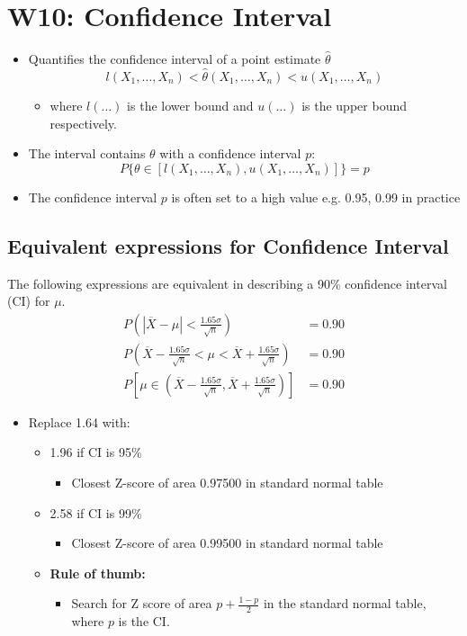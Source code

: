 \documentclass[a4paper]{article}
\begin{document}
\section{W10: Confidence Interval}
\begin{itemize}
    \item Quantifies the confidence interval of a point estimate $\hat{\theta}$
    $$l(X_{1}, \ldots, X_{n})< \hat{\theta}(X_{1}, \ldots, X_{n})<u(X_{1}, \ldots, X_{n})$$
    \begin{itemize}[label=$\circ$]
        \item where $l(\ldots)$ is the lower bound and $u(\ldots)$ is the upper bound respectively. 
    \end{itemize}
    \item The interval contains $\theta$ with a confidence interval $p$:
    $$P\{\theta\in \left[l(X_{1},\ldots, X_{n}), u(X_{1}, \ldots, X_{n})\right] \} = p
    $$
    \item The confidence interval $p$ is often set to a high value e.g. 0.95, 0.99 in practice
\end{itemize}
\subsection{Equivalent expressions for Confidence Interval}
The following expressions are equivalent in describing a 90\% confidence interval (CI) for $\mu$.
\begin{align*}
    P\left(|\overline{X}-\mu| < \frac{1.65\sigma}{\sqrt{n}}\right) &= 0.90\\
    P\left(\overline{X}-\frac{1.65\sigma}{\sqrt{n}}<\mu<\overline{X}+\frac{1.65\sigma}{\sqrt{n}}\right) &= 0.90\\
    P\left[\mu\in\left(\overline{X}-\frac{1.65\sigma}{\sqrt{n}},\overline{X}+\frac{1.65\sigma}{\sqrt{n}}\right)\right] &= 0.90
\end{align*}
\begin{itemize}
    \item Replace 1.64 with:
    \begin{itemize}[label=$\circ$]
        \item 1.96 if CI is 95\%
        \begin{itemize}[label=\tiny$\blacksquare$]
            \item Closest Z-score of area 0.97500 in standard normal table
        \end{itemize}
        \item 2.58 if CI is 99\%
        \begin{itemize}[label=\tiny$\blacksquare$]
            \item Closest Z-score of area 0.99500 in standard normal table
        \end{itemize}
        \item \textbf{Rule of thumb:} 
        \begin{itemize}[label=\tiny$\blacksquare$]
            \item Search for Z score of area $p+\frac{1-p}{2}$ in the standard normal table, where $p$ is the CI.
        \end{itemize}
    \end{itemize}
\end{itemize}
\end{document}
